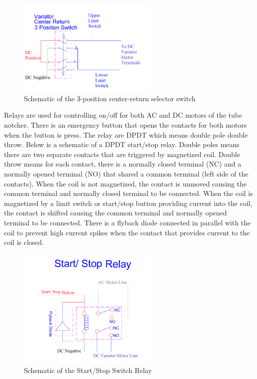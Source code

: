 \begin{figure}[H]
    \centering
    \includegraphics[width=0.6\textwidth]{./fall-report pictures/Chapter2-MachineDescription/3PSwitch}
    \caption{Schematic of the 3-position center-return selector switch}
    \label{fig:Electrical:3PSwitch}
\end{figure} 

Relays are used for controlling on/off for both AC and DC motors of the tube notcher. There is an emergency button that opens the contacts for both motors when the button is press. The relay are DPDT which means double pole double throw. Below is a schematic of a DPDT start/stop relay. Double poles means there are two separate contacts that are triggered by magnetized coil. Double throw means for each contact, there is a normally closed terminal (NC) and a normally opened terminal (NO) that shared a common terminal (left side of the contacts). When the coil is not magnetized, the contact is unmoved causing the common terminal and normally closed terminal to be connected. When the coil is magnetized by a limit switch or start/stop button providing current into the coil, the contact is shifted causing the common terminal and normally opened terminal to be connected. There is a flyback diode connected in parallel with the coil to prevent high current spikes when the contact that provides current to the coil is closed.
\begin{figure}[H]
    \centering
    \includegraphics[width=0.6\textwidth]{./fall-report pictures/Chapter2-MachineDescription/RelayPic}
    \caption{Schematic of the Start/Stop Switch Relay}
    \label{fig:Electrical:StartStopSwitchRelay}
\end{figure} 

